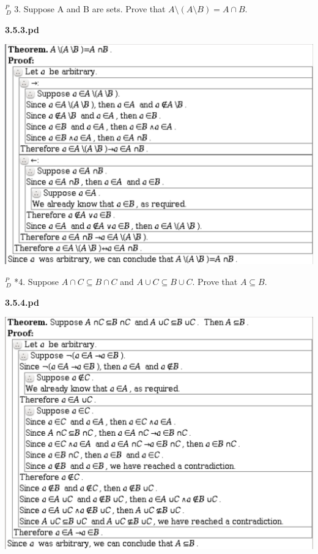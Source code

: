 \documentclass{article}
\begin{document}
$^{\textit{P}}_{\, \textit{D}}$ 3. Suppose A and B are sets. Prove that $A \setminus (A \setminus B) = A \cap B$.

\vspace{30pt}

\textbf{3.5.3.pd}
\vspace{10pt}

\includegraphics[width=\textwidth]{3_5_3}

\vspace{30pt}

$^{\textit{P}}_{\, \textit{D}}$ *4. Suppose $A \cap C \subseteq B \cap C$ and $A \cup C \subseteq B \cup C$. Prove that $A \subseteq B$.

\vspace{30pt}

\textbf{3.5.4.pd}
\vspace{10pt}

\includegraphics[width=\textwidth]{3_5_4}
\end{document}
